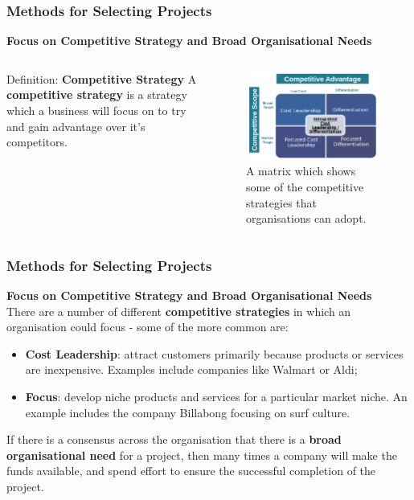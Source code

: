 \documentclass{beamer}
\begin{document}
\begin{frame}
\frametitle{Methods for Selecting Projects}
\textbf{Focus on Competitive Strategy and Broad Organisational Needs}
\begin{columns}[t]
\begin{block}{Definition: \textbf{Competitive Strategy}}
A \textbf{competitive strategy} is a strategy which a business will focus on to try and gain advantage over it's competitors.
\end{block}
\begin{figure}
\includegraphics[scale=0.25]{comp_adv}
\caption{A matrix which shows some of the competitive strategies that organisations can adopt.}
\end{figure}
\end{columns}
\end{frame}
\begin{frame}
\frametitle{Methods for Selecting Projects}
\textbf{Focus on Competitive Strategy and Broad Organisational Needs}\\
\vspace{0.5cm}
There are a number of different \textbf{competitive strategies} in which an organisation could focus - some of the more common are:
\begin{itemize}
\item \textbf{Cost Leadership}: attract customers primarily because products or services are inexpensive. Examples include companies like Walmart or Aldi;
\item \textbf{Focus}: develop niche products and services for a particular market niche. An example includes the company Billabong focusing on surf culture.
\end{itemize}
\vspace{0.5cm}
If there is a consensus across the organisation that there is a \textbf{broad organisational need} for a project, then many times a company will make the funds available, and spend effort to ensure the successful completion of the project.
\end{frame}
\end{document}
